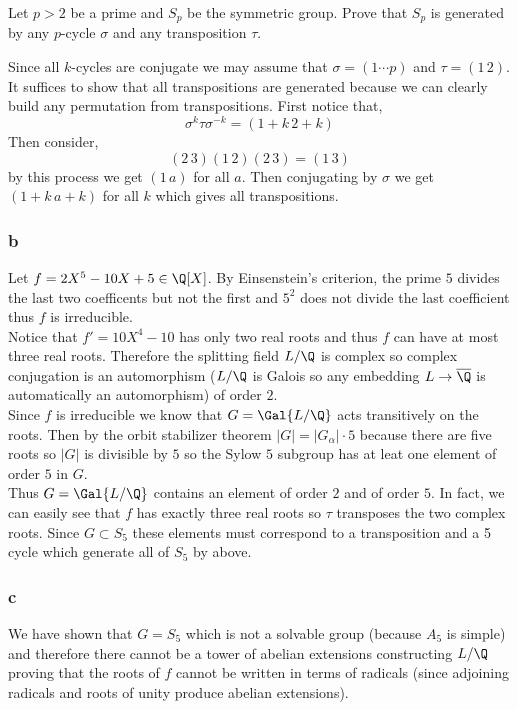 \documentclass[12pt]{article}
\begin{document}
\begin{exercise}
Let $p > 2$ be a prime and $S_p$ be the symmetric group. Prove that $S_p$ is generated by any $p$-cycle $\sigma$ and any transposition $\tau$.
\end{exercise}

Since all $k$-cycles are conjugate we may assume that $\sigma = (1 \cdots p)$ and $\tau = (1 \, 2)$. It suffices to show that all transpositions are generated because we can clearly build any permutation from transpositions. First notice that,
\[ \sigma^{k} \tau \sigma^{-k} = (1 + k \, 2 + k) \] 
Then consider,
\[ (2 \, 3) (1 \, 2) (2 \, 3) = (1 \, 3) \]
by this process we get $(1 \, a)$ for all $a$. Then conjugating by $\sigma$ we get $(1 + k \, a + k)$ for all $k$  which gives all transpositions.

\subsubsection{b}

Let $f = 2 X^5 - 10 X + 5 \in \Q[X]$. By Einsenstein's criterion, the prime $5$ divides the last two coefficents but not the first and $5^2$ does not divide the last coefficient thus $f$ is irreducible. 
\bigskip\\
Notice that $f' = 10 X^4 - 10$ has only two real roots and thus $f$ can have at most three real roots. Therefore the splitting field $L / \Q$ is complex so complex conjugation is an automorphism ($L / \Q$ is Galois so any embedding $L \to \overline{\Q}$ is automatically an automorphism) of order $2$.
\bigskip\\
Since $f$ is irreducible we know that $G = \Gal{L/\Q}$ acts transitively on the roots. Then by the orbit stabilizer theorem $|G| = |G_\alpha| \cdot 5$ because there are five roots so $|G|$ is divisible by $5$ so the Sylow $5$ subgroup has at leat one element of order $5$ in $G$.
\bigskip\\
Thus $G = \Gal{L/\Q}$ contains an element of order $2$ and of order $5$. In fact, we can easily see that $f$ has exactly three real roots so $\tau$ transposes the two complex roots. Since $G \subset S_5$ these elements must correspond to a transposition and a 5 cycle which generate all of $S_5$ by above.

\subsubsection{c}

We have shown that $G = S_5$ which is not a solvable group (because $A_5$ is simple) and therefore there cannot be a tower of abelian extensions constructing $L/\Q$ proving that the roots of $f$ cannot be written in terms of radicals (since adjoining radicals and roots of unity produce abelian extensions). 
\end{document}
